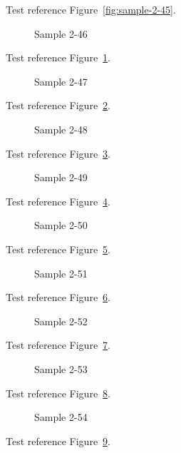 Test reference Figure~\ref{fig:sample-2-45}.

\begin{figure}[tbhp]
\caption{Sample 2-46}
\label{fig:sample-2-46}
\end{figure}

Test reference Figure~\ref{fig:sample-2-46}.

\begin{figure}[tbhp]
\caption{Sample 2-47}
\label{fig:sample-2-47}
\end{figure}

Test reference Figure~\ref{fig:sample-2-47}.

\begin{figure}[tbhp]
\caption{Sample 2-48}
\label{fig:sample-2-48}
\end{figure}

Test reference Figure~\ref{fig:sample-2-48}.

\begin{figure}[tbhp]
\caption{Sample 2-49}
\label{fig:sample-2-49}
\end{figure}

Test reference Figure~\ref{fig:sample-2-49}.

\begin{figure}[tbhp]
\caption{Sample 2-50}
\label{fig:sample-2-50}
\end{figure}

Test reference Figure~\ref{fig:sample-2-50}.

\begin{figure}[tbhp]
\caption{Sample 2-51}
\label{fig:sample-2-51}
\end{figure}

Test reference Figure~\ref{fig:sample-2-51}.

\begin{figure}[tbhp]
\caption{Sample 2-52}
\label{fig:sample-2-52}
\end{figure}

Test reference Figure~\ref{fig:sample-2-52}.

\begin{figure}[tbhp]
\caption{Sample 2-53}
\label{fig:sample-2-53}
\end{figure}

Test reference Figure~\ref{fig:sample-2-53}.

\begin{figure}[tbhp]
\caption{Sample 2-54}
\label{fig:sample-2-54}
\end{figure}

Test reference Figure~\ref{fig:sample-2-54}.

